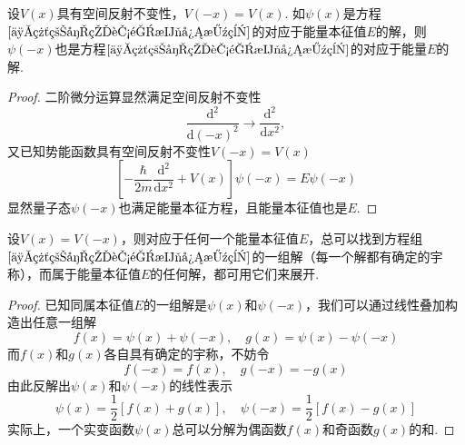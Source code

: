 \begin{theorem}\label{定理3}
    设$V(x)$具有空间反射不变性，$V(-x)=V(x)$. 如$\psi(x)$是方程$\eqref{一维粒子的能量本征方程}$的对应于能量本征值$E$的解，则$\psi(-x)$也是方程$\eqref{一维粒子的能量本征方程}$的对应于能量$E$的解.
\end{theorem}

\begin{proof}
    二阶微分运算显然满足空间反射不变性
    $$
        \frac{\mathrm{d}^2}{\mathrm{d}(-x)^2}\rightarrow\frac{\mathrm{d}^2}{\mathrm{d}x^2},
    $$
    又已知势能函数具有空间反射不变性$V(-x)=V(x)$
    $$
        \left[-\frac{\hbar}{2m}\frac{\mathrm{d}^2}{\mathrm{d}x^2}+V(x)\right]\psi(-x)=E\psi(-x)
    $$
    显然量子态$\psi(-x)$也满足能量本征方程，且能量本征值也是$E$.
\end{proof}




\begin{theorem}\label{定理4}
    设$V(x)=V(-x)$，则对应于任何一个能量本征值$E$，总可以找到方程组$\eqref{一维粒子的能量本征方程}$的一组解（每一个解都有确定的宇称），而属于能量本征值$E$的任何解，都可用它们来展开.
\end{theorem}
\begin{proof}
    已知同属本征值$E$的一组解是$\psi(x)$和$\psi(-x)$，我们可以通过线性叠加构造出任意一组解
    $$
        f(x)=\psi(x)+\psi(-x), \quad g(x)=\psi(x)-\psi(-x)
    $$
    而$f(x)$和$g(x)$各自具有确定的宇称，不妨令
    $$
        f(-x)=f(x), \quad g(-x)=-g(x)
    $$
    由此反解出$\psi(x)$和$\psi(-x)$的线性表示
    $$
        \psi(x)=\frac{1}{2}[f(x)+g(x)], \quad \psi(-x)=\frac{1}{2}[f(x)-g(x)]
    $$
    实际上，一个实变函数$\psi(x)$总可以分解为偶函数$f(x)$和奇函数$g(x)$的和.
\end{proof}




